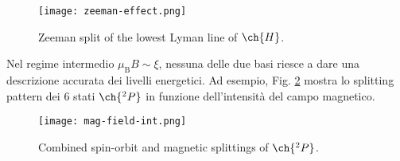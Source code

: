 \begin{figure}
	\centering
	\texttt{[image: zeeman-effect.png]}
	\caption{Zeeman split of the lowest Lyman line of $ \ch{H} $.}
	\label{zeeman-effect}
\end{figure}

Nel regime intermedio $ \mu_\text{B} B \sim \xi $, nessuna delle due basi riesce a dare una descrizione accurata dei livelli energetici. Ad esempio, Fig. \ref{mag-field-int} mostra lo splitting pattern dei 6 stati $ \ch{^2P} $ in funzione dell'intensità del campo magnetico.

\begin{figure}[!b]
	\centering
	\texttt{[image: mag-field-int.png]}
	\caption{Combined spin-orbit and magnetic splittings of $ \ch{^2P} $.}
	\label{mag-field-int}
\end{figure}











